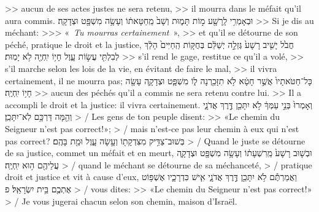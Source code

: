 \begin{paracol}[1]
{    >> aucun de ses actes justes ne sera retenu,
    >> il mourra dans le méfait qu’il aura commis.}
  \verset
  {וּבְאָמְרִ֥י לָֽרָשָׁ֖ע
    מ֣וֹת תָּמ֑וּת
    וְשָׁב֙ מֵֽחַטָּאת֔וֹ וְעָשָׂ֥ה מִשְׁפָּ֖ט וּצְדָקָֽה׃}
  {>> Si je dis au méchant:
    >>> «~\textit{Tu mourras certainement}~»,
    >> et qu’il se détourne de son péché, pratique le droit et la justice,}
  \verset
  {חֲבֹ֙ל יָשִׁ֤יב רָשָׁע֙ גְּזֵלָ֣ה יְשַׁלֵּ֔ם
    בְּחֻקּ֤וֹת הַֽחַיִּים֙ הָלַ֔ךְ לְבִלְתִּ֖י עֲשׂ֣וֹת עָ֑וֶל
    חָי֥וֹ יִֽחְיֶ֖ה לֹ֥א יָמֽוּת׃}
  {>> s’il rend le gage, restitue ce qu’il a volé,
    >> s’il marche selon les lois de la vie, en évitant de faire le mal,
    >> il vivra certainement, il ne mourra pas;}
  \verset
  {כָּל־חַטֹּאתָיו֙ אֲשֶׁ֣ר חָטָ֔א לֹ֥א תִזָּכַ֖רְנָה ל֑וֹ
    מִשְׁפָּ֧ט וּצְדָקָ֛ה עָשָׂ֖ה חָי֥וֹ יִֽחְיֶֽה׃}
  {>> aucun des péchés qu’il a commis ne sera retenu contre lui.
    >> Il a accompli le droit et la justice: il vivra certainement.}
  \verseSpace
  \verset
  {וְאָמְרוּ֙ בְּנֵ֣י עַמְּךָ֔
    לֹ֥א יִתָּכֵ֖ן דֶּ֣רֶךְ אֲדֹנָ֑י
    וְהֵ֖מָּה דַּרְכָּ֥ם לֹֽא־יִתָּכֵֽן׃}
  {> / Les gens de ton peuple disent:
    >> «Le chemin du Seigneur n’est pas correct!»;
    > / mais n’est-ce pas leur chemin à eux qui n’est pas correct?}
  \verset
  {בְּשׁוּב־צַדִּ֥יק מִצִּדְקָת֖וֹ וְעָ֣שָׂה עָ֑וֶל וּמֵ֖ת בָּהֶֽם׃}
  {> / Quand le juste se détourne de sa justice, commet un méfait et en meurt,}
  \verset
  {וּבְשׁ֤וּב רָשָׁע֙ מֵֽרִשְׁעָת֔וֹ
    וְעָשָׂ֥ה מִשְׁפָּ֖ט וּצְדָקָ֑ה עֲלֵיהֶ֖ם ה֥וּא יִֽחְיֶֽה׃}
  {> / quand le méchant se détourne de sa méchanceté,
    > / pratique droit et justice et vit à cause d’eux,}
  \verset
  {וַאֲמַרְתֶּ֕ם
    לֹ֥א יִתָּכֵ֖ן דֶּ֣רֶךְ אֲדֹנָ֑י
    אִ֧ישׁ כִּדְרָכָ֛יו אֶשְׁפּ֥וֹט אֶתְכֶ֖ם בֵּ֥ית יִשְׂרָאֵֽל׃ פ}
  {> / vous dites:
    >> «Le chemin du Seigneur n’est pas correct!»
    > / Je vous jugerai chacun selon son chemin, maison d’Israël.}
  \clearpage

\end{paracol}
